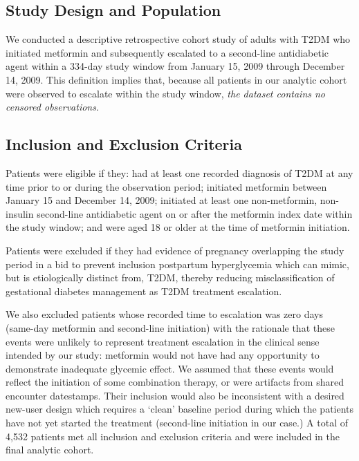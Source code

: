 \documentclass[twoside,11pt]{article}
\newcommand*\circled[1]{\tikz[baseline=(char.base)]{\node[shape=circle,draw,inner sep=1pt] (char) {#1};}}
\begin{document}
\subsection*{Study Design and Population}

We conducted a descriptive retrospective cohort study of adults with T2DM who initiated metformin and subsequently escalated to a second-line antidiabetic agent within a 334-day study window from January 15, 2009 through December 14, 2009. This definition implies that, because all patients in our analytic cohort were observed to escalate within the study window, \textit{the dataset contains no censored observations}.

\subsection*{Inclusion and Exclusion Criteria}

Patients were eligible if they: \circled{1} had at least one recorded diagnosis of T2DM at any time prior to or during the observation period; \circled{2} initiated metformin between January 15 and December 14, 2009; \circled{3} initiated at least one non-metformin, non-insulin second-line antidiabetic agent on or after the metformin index date within the study window; and \circled{4} were aged 18 or older at the time of metformin initiation.

Patients were excluded if they had evidence of pregnancy overlapping the study period in a bid to prevent inclusion postpartum hyperglycemia which can mimic, but is etiologically distinct from, T2DM, thereby reducing misclassification of gestational diabetes management as T2DM treatment escalation.

We also excluded patients whose recorded time to escalation was zero days (same-day metformin and second-line initiation) with the rationale that these events were unlikely to represent treatment escalation in the clinical sense intended by our study: metformin would not have had any opportunity to demonstrate inadequate glycemic effect. We assumed that these events would reflect the initiation of some combination therapy, or were artifacts from shared encounter datestamps. Their inclusion would also be inconsistent with a desired new-user design\cite{lund2015active_comparator} which requires a ‘clean’ baseline period during which the patients have not yet started the treatment (second-line initiation in our case.) A total of 4,532 patients met all inclusion and exclusion criteria and were included in the final analytic cohort.
\end{document}
